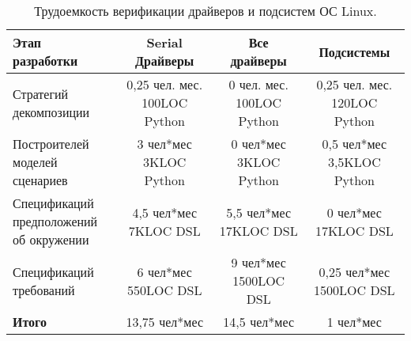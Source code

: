 
\begin{table}
\centering
\begin{tabular}{ | l | c | c | c |}
\hline
Этап разработки& Serial Драйверы & Все драйверы & Подсистемы\\
\hline
\shortstack[l]{Стратегий \\ декомпозиции} & 
\shortstack[c]{0,25 чел. мес. \\ 100LOC Python} & 
\shortstack[c]{0 чел. мес. \\ 100LOC Python} &
\shortstack[c]{0,25 чел. мес. \\ 120LOC Python} \\
\hline
\shortstack[l]{Построителей \\ моделей сценариев} & 
\shortstack[c]{3 чел*мес \\ 3KLOC Python} &
\shortstack[c]{0 чел*мес \\ 3KLOC Python} &
\shortstack[c]{0,5 чел*мес \\ 3,5KLOC Python} \\
\hline
\shortstack[l]{Спецификаций \\ предположений \\об окружении} & 
\shortstack[c]{4,5 чел*мес \\ 7KLOC DSL} &
\shortstack[c]{5,5 чел*мес \\ 17KLOC DSL} &
\shortstack[c]{0 чел*мес \\ 17KLOC DSL} \\
\hline
\shortstack[l]{Спецификаций \\ требований} &
\shortstack[c]{6 чел*мес \\ 550LOC DSL} &
\shortstack[c]{9 чел*мес \\ 1500LOC DSL} & 
\shortstack[c]{0,25 чел*мес \\ 1500LOC DSL} \\
\hline
\textbf{Итого} & 13,75 чел*мес & 14,5 чел*мес & 1 чел*мес \\
\hline
\end{tabular}
\caption{Трудоемкость верификации драйверов и подсистем ОС Linux.}
\label{table:difficulty}
\end{table}

